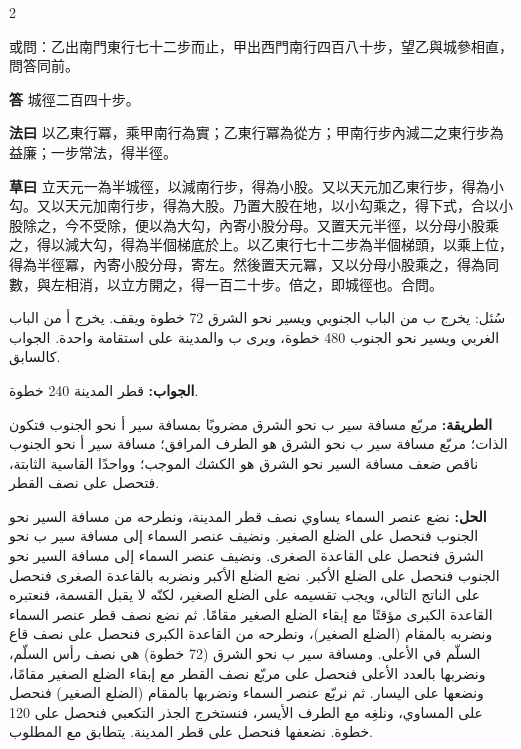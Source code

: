 \documentclass[11pt,a4paper]{article}
\newcommand{\ar}[1]{\arabicfont\beginR #1\endR}
\newcommand{\Answer}[1]{\par\noindent\textbf{\color{problemcolor}答} #1\par}
\newcommand{\Method}[1]{\par\noindent\textbf{\color{problemcolor}法曰} #1\par}
\newcommand{\Workings}[1]{\par\noindent\textbf{\color{problemcolor}草曰} #1\par}
\newcommand{\AnswerAr}{\par\noindent\textbf{\color{problemcolor}\ar{الجواب:}} }
\newcommand{\MethodAr}{\par\noindent\textbf{\color{problemcolor}\ar{الطريقة:}} }
\newcommand{\WorkingsAr}{\par\noindent\textbf{\color{problemcolor}\ar{الحل:}} }
\begin{document}
\begin{paracol}{2}

\noindent 或問：乙出南門東行七十二步而止，甲出西門南行四百八十步，望乙與城參相直，問答同前。

\vspace{0.2cm}

\Answer{城徑二百四十步。}

\vspace{0.2cm}

\Method{以乙東行冪，乘甲南行為實；乙東行冪為從方；甲南行步內減二之東行步為益廉；一步常法，得半徑。}

\vspace{0.2cm}

\Workings{立天元一為半城徑，以減南行步，得為小股。又以天元加乙東行步，得為小勾。又以天元加南行步，得為大股。乃置大股在地，以小勾乘之，得下式，合以小股除之，今不受除，便以為大勾，內寄小股分母。又置天元半徑，以分母小股乘之，得以減大勾，得為半個梯底於上。以乙東行七十二步為半個梯頭，以乘上位，得為半徑冪，內寄小股分母，寄左。然後置天元冪，又以分母小股乘之，得為同數，與左相消，以立方開之，得一百二十步。倍之，即城徑也。合問。}

\switchcolumn

\ar{سُئل: يخرج ب من الباب الجنوبي ويسير نحو الشرق 72 خطوة ويقف. يخرج أ من الباب الغربي ويسير نحو الجنوب 480 خطوة، ويرى ب والمدينة على استقامة واحدة. الجواب كالسابق.}

\vspace{0.2cm}

\AnswerAr{قطر المدينة 240 خطوة.}

\vspace{0.2cm}

\MethodAr{مربّع مسافة سير ب نحو الشرق مضروبًا بمسافة سير أ نحو الجنوب فتكون الذات؛ مربّع مسافة سير ب نحو الشرق هو الطرف المرافق؛ مسافة سير أ نحو الجنوب ناقص ضعف مسافة السير نحو الشرق هو الكشك الموجب؛ وواحدًا القاسية الثابتة، فتحصل على نصف القطر.}

\vspace{0.2cm}

\WorkingsAr{نضع عنصر السماء يساوي نصف قطر المدينة، ونطرحه من مسافة السير نحو الجنوب فنحصل على الضلع الصغير. ونضيف عنصر السماء إلى مسافة سير ب نحو الشرق فنحصل على القاعدة الصغرى. ونضيف عنصر السماء إلى مسافة السير نحو الجنوب فنحصل على الضلع الأكبر. نضع الضلع الأكبر ونضربه بالقاعدة الصغرى فنحصل على الناتج التالي، ويجب تقسيمه على الضلع الصغير، لكنّه لا يقبل القسمة، فنعتبره القاعدة الكبرى مؤقتًا مع إبقاء الضلع الصغير مقامًا. ثم نضع نصف قطر عنصر السماء ونضربه بالمقام (الضلع الصغير)، ونطرحه من القاعدة الكبرى فنحصل على نصف قاع السلّم في الأعلى. ومسافة سير ب نحو الشرق (72 خطوة) هي نصف رأس السلّم، ونضربها بالعدد الأعلى فنحصل على مربّع نصف القطر مع إبقاء الضلع الصغير مقامًا، ونضعها على اليسار. ثم نربّع عنصر السماء ونضربها بالمقام (الضلع الصغير) فنحصل على المساوي، ونلغِه مع الطرف الأيسر، فنستخرج الجذر التكعبي فنحصل على 120 خطوة. نضعفها فنحصل على قطر المدينة. يتطابق مع المطلوب.}

\end{paracol}
\end{document}
